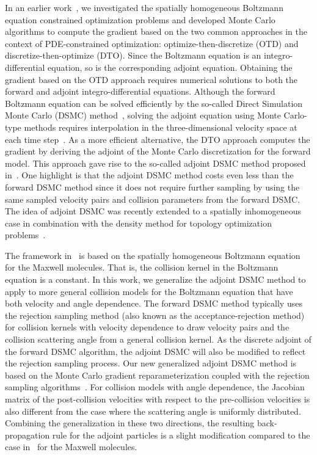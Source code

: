 \documentclass[12pt,nopreprintline]{elsarticle}
\begin{document}
In an earlier work~\cite{caflisch2021adjoint}, we investigated the spatially homogeneous Boltzmann equation constrained optimization problems and developed Monte Carlo algorithms to compute the gradient based on the two common approaches in the context of PDE-constrained optimization: optimize-then-discretize (OTD) and discretize-then-optimize (DTO). Since the Boltzmann equation is an integro-differential equation, so is the corresponding adjoint equation. Obtaining the gradient based on the OTD approach requires numerical solutions to both the forward and adjoint integro-differential equations. Although the forward Boltzmann equation can be solved efficiently by the so-called Direct Simulation Monte Carlo (DSMC) method~\cite{bird1970direct,nanbu1980direct,babovsky1986simulation,babovsky1989convergence,pareschi2001introduction}, solving the adjoint equation using Monte Carlo-type methods requires interpolation in the three-dimensional velocity space at each time step~\cite{caflisch2021adjoint}. As a more efficient alternative, the DTO approach computes the gradient by deriving the adjoint of the Monte Carlo discretization for the forward model. This approach gave rise to the so-called adjoint DSMC method proposed in~\cite{caflisch2021adjoint}. One highlight is that the adjoint DSMC method costs even less than the forward DSMC method since it does not require further sampling by using the same sampled velocity pairs and collision parameters from the forward DSMC.
The idea of adjoint DSMC was recently extended to a spatially inhomogeneous case in combination with the density method for topology optimization problems~\cite{guanatopology}.

The framework in~\cite{caflisch2021adjoint} is based on the spatially homogeneous Boltzmann equation for the Maxwell molecules. That is, the collision kernel in the Boltzmann equation is a constant. In this work, we generalize the adjoint DSMC method to apply to more general collision models for the Boltzmann equation that have both velocity and angle dependence. The forward DSMC method typically uses the rejection sampling method (also known as the acceptance-rejection method) for collision kernels with velocity dependence to draw velocity pairs and the collision scattering angle from a general collision kernel. As the discrete adjoint of the forward DSMC algorithm, the adjoint DSMC will also be modified to reflect the rejection sampling process. Our new generalized adjoint DSMC method is based on the Monte Carlo gradient reparameterization coupled with the rejection sampling algorithms~\cite{Blei2017,mohamed2019monte}. For collision models with angle dependence, the Jacobian matrix of the post-collision velocities with respect to the pre-collision velocities is also different from the case where the scattering angle is uniformly distributed. Combining the generalization in these two directions, the resulting back-propagation rule for the adjoint particles is a slight modification compared to the case in~\cite{caflisch2021adjoint} for the Maxwell molecules. 
\end{document}
